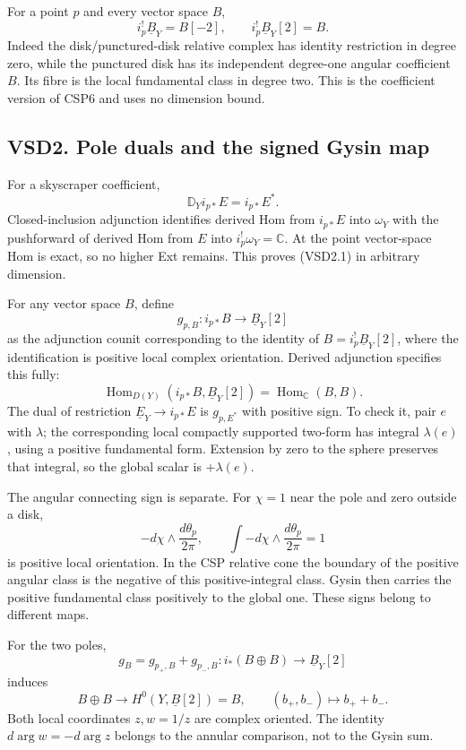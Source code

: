 For a point \(p\) and every vector space \(B\), \[
i_p^!\underline B_Y=B[-2],\qquad i_p^!\underline B_Y[2]=B.
\tag{VSD1.6}
\] Indeed the disk/punctured-disk relative complex has identity
restriction in degree zero, while the punctured disk has its independent
degree-one angular coefficient \(B\). Its fibre is the local fundamental
class in degree two. This is the coefficient version of CSP6 and uses no
dimension bound.

\subsection{VSD2. Pole duals and the signed Gysin
map}\label{vsd2.-pole-duals-and-the-signed-gysin-map}

For a skyscraper coefficient, \[
\boxed{\mathbb D_Yi_{p*}E=i_{p*}E^*.}
\tag{VSD2.1}
\] Closed-inclusion adjunction identifies derived Hom from \(i_{p*}E\)
into \(\omega_Y\) with the pushforward of derived Hom from \(E\) into
\(i_p^!\omega_Y=\mathbb C\). At the point vector-space Hom is exact, so
no higher Ext remains. This proves (VSD2.1) in arbitrary dimension.

For any vector space \(B\), define \[
g_{p,B}:i_{p*}B\longrightarrow\underline B_Y[2]
\tag{VSD2.2}
\] as the adjunction counit corresponding to the identity of
\(B=i_p^!\underline B_Y[2]\), where the identification is positive local
complex orientation. Derived adjunction specifies this fully: \[
\operatorname{Hom}_{D(Y)}(i_{p*}B,\underline B_Y[2])
=\operatorname{Hom}_{\mathbb C}(B,B).
\tag{VSD2.3}
\] The dual of restriction \(\underline E_Y\to i_{p*}E\) is
\(g_{p,E^*}\) with positive sign. To check it, pair \(e\) with
\(\lambda\); the corresponding local compactly supported two-form has
integral \(\lambda(e)\), using a positive fundamental form. Extension by
zero to the sphere preserves that integral, so the global scalar is
\(+\lambda(e)\).

The angular connecting sign is separate. For \(\chi=1\) near the pole
and zero outside a disk, \[
-d\chi\wedge\frac{d\theta_p}{2\pi},
\qquad \int -d\chi\wedge\frac{d\theta_p}{2\pi}=1
\tag{VSD2.4}
\] is positive local orientation. In the CSP relative cone the boundary
of the positive angular class is the negative of this positive-integral
class. Gysin then carries the positive fundamental class positively to
the global one. These signs belong to different maps.

For the two poles, \[
g_B=g_{p_+,B}+g_{p_-,B}:i_*(B\oplus B)\to\underline B_Y[2]
\tag{VSD2.5}
\] induces \[
B\oplus B\to H^0(Y,\underline B[2])=B,
\qquad(b_+,b_-)\mapsto b_++b_-.
\tag{VSD2.6}
\] Both local coordinates \(z,w=1/z\) are complex oriented. The identity
\(d\arg w=-d\arg z\) belongs to the annular comparison, not to the Gysin
sum.

